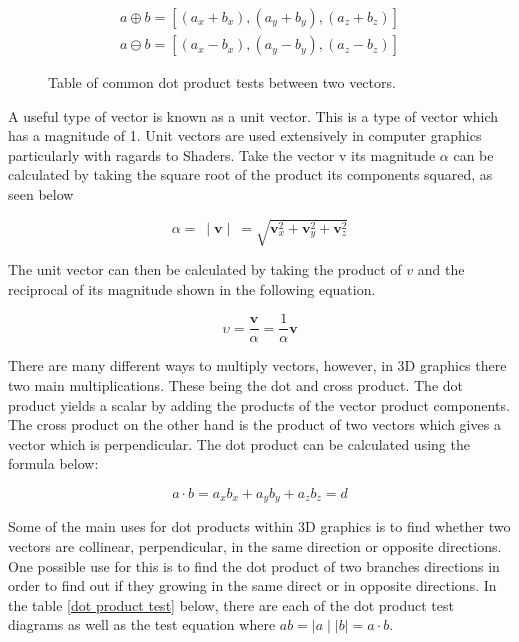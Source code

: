 \begin{equation}
\begin{aligned}
a \oplus b = [(a_x + b_x), (a_y + b_y), (a_z + b_z)]\\
a \ominus b = [(a_x - b_x), (a_y - b_y), (a_z - b_z)]
\end{aligned}
\end{equation}

\begin{figure}[htbp]
	{\centering
		\setlength{\fboxrule}{1pt}
		\vspace{7px}
		\caption{Table of common dot product tests between two vectors.}
	}
\end{figure}
\FloatBarrier

\noindent
A useful type of vector is known as a unit vector. This is a type of vector which has a magnitude of 1. Unit vectors are used extensively in computer graphics particularly with ragards to \gls{Shader}s. Take the vector v its magnitude $\alpha$ can be calculated by taking the square root of the product its components squared, as seen below 

\begin{equation}
	\alpha =~ \mid \textbf{v} \mid~ = \sqrt{\textbf{v}^2_x + \textbf{v}^2_y + \textbf{v}^2_z}
\end{equation}

The unit vector can then be calculated by taking the product of $v$ and the reciprocal of its magnitude shown in the following equation.

\begin{equation}
	\upsilon = \frac{\textbf{v}}{\alpha} = \frac{1}{\alpha} \textbf{v}
\end{equation}

There are many different ways to multiply vectors, however, in 3D graphics there two main multiplications. These being the dot and cross product. The dot product yields a scalar by adding the products of the vector product components. The cross product on the other hand is the product of two vectors which gives a vector which is perpendicular. The dot product can be calculated using the formula below: 

\begin{equation}
a \cdot b = a_x b_x + a_y b_y + a_z b_z = d
\end{equation}

\noindent
Some of the main uses for dot products within 3D graphics is to find whether two vectors are collinear, perpendicular, in the same direction or opposite directions. One possible use for this is to find the dot product of two branches directions in order to find out if they growing in the same direct or in opposite directions. In the table \ref{dot product test} below, there are each of the dot product test diagrams as well as the test equation where $ab = \mid a \mid \mid b \mid = a \cdot b$.

